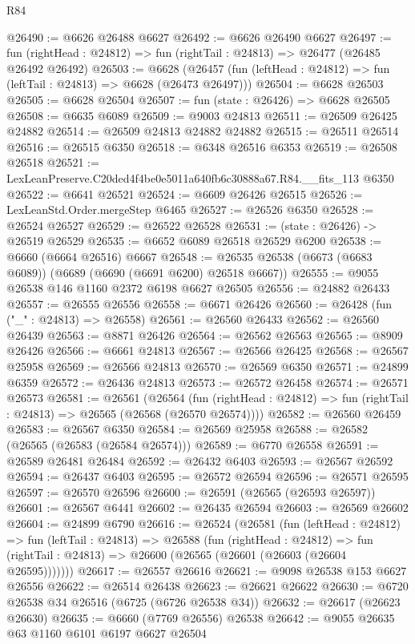 \begin{lexlean}{R84}
\begin{coremodule}
@26490 := @6626 @26488 @6627
@26492 := @6626 @26490 @6627
@26497 := fun (rightHead : @24812) => fun (rightTail : @24813) => @26477 (@26485 @26492 @26492)
@26503 := @6628
    (@26457 (fun (leftHead : @24812) => fun (leftTail : @24813) => @6628 (@26473 @26497)))
@26504 := @6628 @26503
@26505 := @6628 @26504
@26507 := fun (state : @26426) => @6628 @26505
@26508 := @6635 @6089
@26509 := @9003 @24813
@26511 := @26509 @26425 @24882
@26514 := @26509 @24813 @24882 @24882
@26515 := @26511 @26514
@26516 := @26515 @6350
@26518 := @6348 @26516 @6353
@26519 := @26508 @26518
@26521 := LexLeanPreserve.C20ded4f4be0e5011a640fb6c30888a67.R84.__fits_113 @6350
@26522 := @6641 @26521
@26524 := @6609 @26426 @26515
@26526 := LexLeanStd.Order.mergeStep @6465
@26527 := @26526 @6350
@26528 := @26524 @26527
@26529 := @26522 @26528
@26531 := (state : @26426) -> @26519 @26529
@26535 := @6652 @6089 @26518 @26529 @6200
@26538 := @6660 (@6664 @26516) @6667
@26548 := @26535 @26538 (@6673 (@6683 @6089)) (@6689 (@6690 (@6691 @6200) @26518 @6667))
@26555 := @9055 @26538 @146 @1160 @2372 @6198 @6627 @26505
@26556 := @24882 @26433
@26557 := @26555 @26556
@26558 := @6671 @26426
@26560 := @26428 (fun ("_" : @24813) => @26558)
@26561 := @26560 @26433
@26562 := @26560 @26439
@26563 := @8871 @26426
@26564 := @26562 @26563
@26565 := @8909 @26426
@26566 := @6661 @24813
@26567 := @26566 @26425
@26568 := @26567 @25958
@26569 := @26566 @24813
@26570 := @26569 @6350
@26571 := @24899 @6359
@26572 := @26436 @24813
@26573 := @26572 @26458
@26574 := @26571 @26573
@26581 := @26561
    (@26564
      (fun (rightHead : @24812) => fun (rightTail : @24813) => @26565 (@26568 (@26570 @26574))))
@26582 := @26560 @26459
@26583 := @26567 @6350
@26584 := @26569 @25958
@26588 := @26582 (@26565 (@26583 (@26584 @26574)))
@26589 := @6770 @26558
@26591 := @26589 @26481 @26484
@26592 := @26432 @6403
@26593 := @26567 @26592
@26594 := @26437 @6403
@26595 := @26572 @26594
@26596 := @26571 @26595
@26597 := @26570 @26596
@26600 := @26591 (@26565 (@26593 @26597))
@26601 := @26567 @6441
@26602 := @26435 @26594
@26603 := @26569 @26602
@26604 := @24899 @6790
@26616 := @26524
    (@26581
      (fun (leftHead : @24812) =>
      fun (leftTail : @24813) =>
      @26588
        (fun (rightHead : @24812) =>
        fun (rightTail : @24813) => @26600 (@26565 (@26601 (@26603 (@26604 @26595)))))))
@26617 := @26557 @26616
@26621 := @9098 @26538 @153 @6627 @26556
@26622 := @26514 @26438
@26623 := @26621 @26622
@26630 := @6720 @26538 @34 @26516 (@6725 (@6726 @26538 @34))
@26632 := @26617 (@26623 @26630)
@26635 := @6660 (@7769 @26556) @26538
@26642 := @9055 @26635 @63 @1160 @6101 @6197 @6627 @26504

\end{coremodule}
\end{lexlean}
